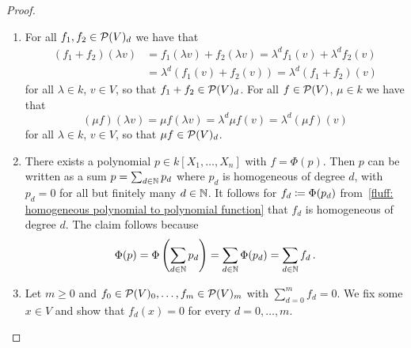 \begin{proof}
  \leavevmode
  \begin{enumerate}
    \item
      For all $f_1, f_2 \in \mathcal{P}(V)_d$ we have that
      \begin{align*}
            (f_1+f_2)(\lambda v)
        &=  f_1(\lambda v) + f_2(\lambda v)
         =  \lambda^d f_1(v) + \lambda^d f_2(v) \\
        &=  \lambda^d (f_1(v) + f_2(v))
         =  \lambda^d (f_1 + f_2)(v)
      \end{align*}
      for all $\lambda \in k$, $v \in V$, so that $f_1 + f_2 \in \mathcal{P}(V)_d$.
      For all $f \in \mathcal{P}(V)$, $\mu \in k$ we have that
      \[
          (\mu f)(\lambda v)
        = \mu f(\lambda v)
        = \lambda^d \mu f(v)
        = \lambda^d (\mu f)(v)
      \]
      for all $\lambda \in k$, $v \in V$, so that $\mu f \in \mathcal{P}(V)_d$.
    \item
      There exists a polynomial $p \in k[X_1, \dotsc, X_n]$ with $f = \Phi(p)$.
      Then $p$ can be written as a sum $p = \sum_{d \in \mathbb{N}} p_d$ where $p_d$ is homogeneous of degree $d$, with $p_d = 0$ for all but finitely many $d \in \mathbb{N}$.
      It follows for $f_d \coloneqq \Phi(p_d)$ from~\ref{fluff: homogeneous polynomial to polynomial function} that $f_d$ is homogeneous of degree $d$.
      The claim follows because
      \[
          \Phi(p)
        = \Phi\left( \sum_{d \in \mathbb{N}} p_d \right)
        = \sum_{d \in \mathbb{N}} \Phi(p_d)
        = \sum_{d \in \mathbb{N}} f_d \,.
      \]
    \item
      Let $m \geq 0$ and $f_0 \in \mathcal{P}(V)_0, \dotsc, f_m \in \mathcal{P}(V)_m$ with $\sum_{d=0}^m f_d = 0$.
      We fix some $x \in V$ and show that $f_d(x) = 0$ for every $d = 0, \dotsc, m$.
      

\end{enumerate}
\end{proof}
